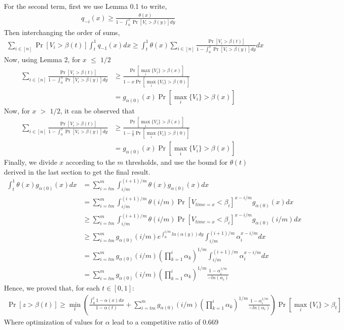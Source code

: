 \documentclass[12pt, letterpaper, twoside]{article}
\begin{document}
	For the second term, first we use Lemma 0.1 to write,
	\begin{align*}
		q_{-i}(x) \geq \frac{\theta(x)}{1-\int_{0}^{x} \Pr[V_{i} > \beta(y)]  dy}
	\end{align*}
	Then interchanging the order of sums,
	\begin{align*}
		\sum_{i \in [n]} \Pr[V_{i} > \beta(t)] \int_{t}^{1} q_{-1}(x) dx \geq \int_{t}^{1} \theta(x) \sum_{i \in [n]} \frac{\Pr[V_{i} > \beta(t)]}{1 - \int_{0}^{x} \Pr[V_{i} > \beta(y)] dy} dx
	\end{align*}
	Now, using Lemma 2, for $x$ $\leq$ $1/2$
	\begin{align*}
		\sum_{i \in [n]} \frac{\Pr[V_{i} > \beta(t)]}{1 - \int_{0}^{x} \Pr[V_{i} > \beta(y)] dy} &\geq \frac{\Pr[\max_{i} \{V_{i}\} > \beta(x)]}{1-x\Pr[\max_{i} \{V_{i}\} > \beta(0)]}\\
		&= g_{\alpha(0)} (x) \Pr[\max_{i} \{V_{i}\} > \beta(x)]
	\end{align*}
	Now, for $x$ $>$ $1/2$, it can be observed that \\
	\begin{align*}
		\sum_{i \in [n]} \frac{\Pr[V_{i} > \beta(t)]}{1 - \int_{0}^{x} \Pr[V_{i} > \beta(y)] dy} &\geq \frac{\Pr[\max_{i} \{V_{i}\} > \beta(x)]}{1-\frac{1}{2}\Pr[\max_{i} \{V_{i}\} > \beta(0)]} \\
		&= g_{\alpha(0)} (x) \Pr[\max_{i} \{V_{i}\} > \beta(x)]
	\end{align*}
	Finally, we divide $x$ according to the $m$ thresholds, and use the bound for $\theta(t)$ derived in the last section to get the final result.
	\begin{align*}
		\int_{t}^{1} \theta(x) g_{\alpha(0)} (x) dx &= \sum_{i = tm}^{m} \int_{i/m}^{(i+1)/m} \theta(x) g_{\alpha(0)} (x) dx\\
		&= \sum_{i = tm}^{m} \int_{i/m}^{(i+1)/m} \theta(i/m) \Pr[V_{time=x} < \beta_{i}]^{x - i/m} g_{\alpha(0)} (x) dx\\
		&\geq \sum_{i = tm}^{m} \int_{i/m}^{(i+1)/m} \theta(i/m) \Pr[V_{time=x} < \beta_{i}]^{x - i/m} g_{\alpha(0)} (i/m) dx\\
		&\geq \sum_{i = tm}^{m} g_{\alpha(0)}(i/m) e^{\int_{0}^{i/m} ln(\alpha(y)) dy} \int_{i/m}^{(i+1)/m} \alpha_{i}^{x - i/m}  dx\\
		&= \sum_{i = tm}^{m} g_{\alpha(0)}(i/m) (\prod_{k=1}^{i} \alpha_{k})^{1/m} \int_{i/m}^{(i+1)/m} \alpha_{i}^{x - i/m}  dx\\
		&= \sum_{i = tm}^{m} g_{\alpha(0)}(i/m) (\prod_{k=1}^{i} \alpha_{k})^{1/m} \frac{1 - \alpha_{i} ^ {1/m}}{-ln(\alpha_{i})}
	\end{align*}
	Hence, we proved that, for each $t \in [0,1]$:
	\begin{align*}
		\Pr[z > \beta(t)] \geq \min_{t}\left(\frac{\int_{0}^{t} 1 - \alpha(x) dx}{1-\alpha(t)} + \sum_{i = tm}^{m} g_{\alpha(0)}(i/m) (\prod_{k=1}^{i} \alpha_{k})^{1/m} \frac{1 - \alpha_{i} ^ {1/m}}{-ln(\alpha_{i})}\right) \Pr[\max_{i} \{V_{i}\} > \beta_{t}]
	\end{align*}
	Where optimization of values for $\alpha$ lead to a competitive ratio of 0.669
\end{document}
